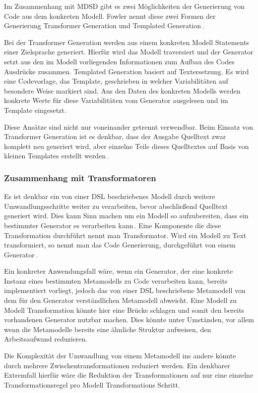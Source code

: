 \documentclass[12pt,oneside,a4paper,parskip]{scrbook}
\begin{document}
Im Zusammenhang mit MDSD gibt es zwei Möglichkeiten der Generierung von Code aus dem konkreten Modell. Fowler nennt diese zwei Formen der Generierung Transformer Generation und Templated Generation\,\cite[S. 124f.]{fowler2010}.

Bei der Transformer Generation werden aus einem konkreten Modell Statements einer Zielsprache generiert. Hierfür wird das Modell traversiert und der Generator setzt aus den im Modell vorliegenden Informationen zum Aufbau des Codes Ausdrücke zusammen. Templated Generation basiert auf Textersetzung. Es wird eine Codevorlage, das Template, geschrieben in welcher Variabilitäten auf besondere Weise markiert sind. Aus den Daten des konkreten Modells werden konkrete Werte für diese Variabilitäten vom Generator ausgelesen und im Template eingesetzt.

Diese Ansätze sind nicht nur voneinander getrennt verwendbar. Beim Einsatz von Transformer Generation ist es denkbar, dass der Ausgabe Quelltext zwar komplett neu generiert wird, aber einzelne Teile dieses Quelltextes auf Basis von kleinen Templates erstellt werden\,\cite[S. 125]{fowler2010}.

\subsubsection{Zusammenhang mit Transformatoren}

Es ist denkbar ein von einer DSL beschriebenes Modell durch weitere Umwandlungsschritte weiter zu verarbeiten, bevor abschließend Quelltext generiert wird. Dies kann Sinn machen um ein Modell so aufzubereiten, dass ein bestimmter Generator es verarbeiten kann\,\cite[S. 195]{stahl2007}. Eine Komponente die diese Transformation durchführt nennt man Transformator. Wird ein Modell zu Text transformiert, so nennt man das Code Generierung, durchgeführt von einem Generator\,\cite[S. 271]{voelter2013}.

Ein konkreter Anwendungsfall wäre, wenn ein Generator, der eine konkrete Instanz eines bestimmten Metamodells zu Code verarbeiten kann, bereits implementiert vorliegt, jedoch das von einer DSL beschriebene Metamodell von dem für den Generator verständlichen Metamodell abweicht. Eine Modell zu Modell Transformation könnte hier eine Brücke schlagen und somit den bereits vorhandenen Generator nutzbar machen. Dies könnte unter Umständen, vor allem wenn die Metamodelle bereits eine ähnliche Struktur aufweisen, den Arbeitsaufwand reduzieren.

Die Komplexität der Umwandlung von einem Metamodell ins andere könnte durch mehrere Zwischentransformationen reduziert werden. Ein denkbarer Extremfall hierfür wäre die Reduktion der Transformationen auf nur eine einzelne Transformationsregel pro Modell Transformations Schritt.
\end{document}
